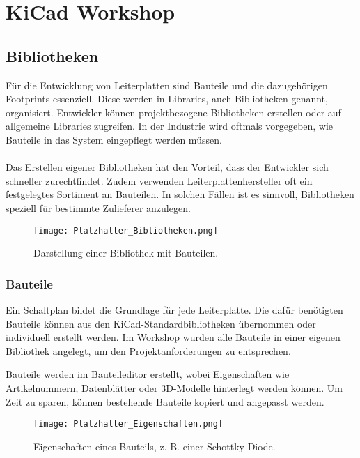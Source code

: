 \section{KiCad Workshop}  

\subsection{Bibliotheken}  
Für die Entwicklung von Leiterplatten sind Bauteile und die dazugehörigen Footprints essenziell.
Diese werden in Libraries, auch Bibliotheken genannt, organisiert. Entwickler können projektbezogene Bibliotheken erstellen oder auf allgemeine Libraries zugreifen.
In der Industrie wird oftmals vorgegeben, wie Bauteile in das System eingepflegt werden müssen.\\  
\\
Das Erstellen eigener Bibliotheken hat den Vorteil, dass der Entwickler sich schneller zurechtfindet.
Zudem verwenden Leiterplattenhersteller oft ein festgelegtes Sortiment an Bauteilen.
In solchen Fällen ist es sinnvoll, Bibliotheken speziell für bestimmte Zulieferer anzulegen.  

\begin{figure}[h]  
    \centering  
    \texttt{[image: Platzhalter\_Bibliotheken.png]}  
    \caption{Darstellung einer Bibliothek mit Bauteilen.} 
    \label{fig:Abbildung 5} 
\end{figure}  

\subsubsection{Bauteile}  
Ein Schaltplan bildet die Grundlage für jede Leiterplatte.
Die dafür benötigten Bauteile können aus den KiCad-Standardbibliotheken übernommen oder individuell erstellt werden.
Im Workshop wurden alle Bauteile in einer eigenen Bibliothek angelegt, um den Projektanforderungen zu entsprechen.  

Bauteile werden im Bauteileditor erstellt, wobei Eigenschaften wie Artikelnummern, Datenblätter oder 3D-Modelle hinterlegt werden können.
Um Zeit zu sparen, können bestehende Bauteile kopiert und angepasst werden.  

\begin{figure}[h]  
    \centering  
    \texttt{[image: Platzhalter\_Eigenschaften.png]}  
    \caption{Eigenschaften eines Bauteils, z. B. einer Schottky-Diode.}  
    \label{fig:Abbildung 6}
\end{figure}  

